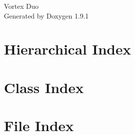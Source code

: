 \let\mypdfximage\pdfximage\def\pdfximage{\immediate\mypdfximage}\documentclass[twoside]{book}
\newcommand{\+}{\discretionary{\mbox{\scriptsize$\hookleftarrow$}}{}{}}
\newcommand{\clearemptydoublepage}{%
  \newpage{\pagestyle{empty}\cleardoublepage}%
}
\begin{document}
\raggedbottom

\hypersetup{pageanchor=false,
             bookmarksnumbered=true,
             pdfencoding=unicode
            }
\begin{titlepage}
\vspace*{7cm}
\begin{center}%
{\Large Vortex Duo }\\
\vspace*{1cm}
{\large Generated by Doxygen 1.9.1}\\
\end{center}
\end{titlepage}
\clearemptydoublepage
{}
\tableofcontents
\clearemptydoublepage
{}
\hypersetup{pageanchor=true}

\chapter{Hierarchical Index}

\chapter{Class Index}

\chapter{File Index}

\end{document}
